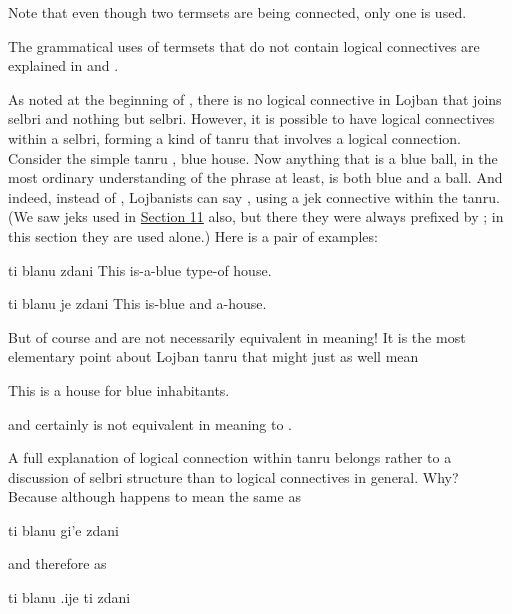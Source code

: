 Note that even though two termsets are being connected, only
    one  is used.

The grammatical uses of termsets that do not contain logical
    connectives are explained in  and .



As noted at the beginning of ,
    there is no logical connective in Lojban that joins selbri and
    nothing but selbri. However, it is possible to have logical
    connectives within a selbri, forming a kind of tanru that
    involves a logical connection. Consider the simple tanru
    , blue house. Now anything that is a blue ball,
    in the most ordinary understanding of the phrase at least, is
    both blue and a ball. And indeed, instead of ,
    Lojbanists can say , using a jek connective
    within the tanru. (We saw jeks used in \hyperref[sec:14:11]{Section
    11} also, but there they were always prefixed by ;
    in this section they are used alone.) Here is a pair of
    examples:
\begin{example}
ti blanu zdani\n
This is-a-blue type-of house.
\end{example}

\begin{example}
ti blanu je zdani\n
This is-blue and a-house.
\end{example}

But of course  and  are not necessarily equivalent
    in meaning! It is the most elementary point about Lojban tanru
    that  might just as well mean
\begin{example}
This is a house for blue inhabitants.
\end{example}

{\noindent}and  certainly is not
    equivalent in meaning to . 

A full explanation of logical connection within tanru
    belongs rather to a discussion of selbri structure than to
    logical connectives in general. Why? Because although  happens to mean the same as
\begin{example}
ti blanu gi'e zdani
\end{example}

{\noindent}and therefore as
\begin{example}
ti blanu .ije ti zdani
\end{example}

